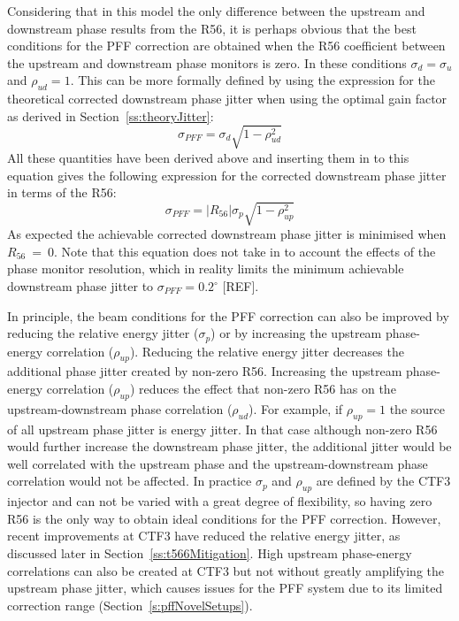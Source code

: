 Considering that in this model the only difference between the upstream and downstream phase results from the R56, it is perhaps obvious that the best conditions for the PFF correction are obtained when the R56 coefficient between the upstream and downstream phase monitors is zero. In these conditions \(\sigma_d = \sigma_u\) and \(\rho_{ud} = 1\). This can be more formally defined by using the expression for the theoretical corrected downstream phase jitter when using the optimal gain factor as derived in Section~\ref{ss:theoryJitter}:
\begin{equation}
\sigma_{PFF} = \sigma_d\sqrt{1-\rho_{ud}^2}
\end{equation}
All these quantities have been derived above and inserting them in to this equation gives the following expression for the corrected downstream phase jitter in terms of the R56:
\begin{equation}
\sigma_{PFF} = \left|R_{56}\right|\sigma_p\sqrt{1-\rho_{up}^2}
\label{e:r56PFFJit}
\end{equation}
As expected the achievable corrected downstream phase jitter is minimised when \(R_{56}~=~0\). Note that this equation does not take in to account the effects of the phase monitor resolution, which in reality limits the minimum achievable downstream phase jitter to \(\sigma_{PFF}=0.2^\circ\) [REF]. 

In principle, the beam conditions for the PFF correction can also be improved by reducing the relative energy jitter (\(\sigma_p\)) or by increasing the upstream phase-energy correlation (\(\rho_{up}\)). Reducing the relative energy jitter decreases the additional phase jitter created by non-zero R56. Increasing the upstream phase-energy correlation (\(\rho_{up}\)) reduces the effect that non-zero R56 has on the upstream-downstream phase correlation (\(\rho_{ud}\)). For example, if \(\rho_{up}=1\) the source of all upstream phase jitter is energy jitter. In that case although non-zero R56 would further increase the downstream phase jitter, the additional jitter would be well correlated with the upstream phase and the upstream-downstream phase correlation would not be affected. In practice \(\sigma_p\) and \(\rho_{up}\) are defined by the CTF3 injector and can not be varied with a great degree of flexibility, so having zero R56 is the only way to obtain ideal conditions for the PFF correction. However, recent improvements at CTF3 have reduced the relative energy jitter, as discussed later in Section~\ref{ss:t566Mitigation}. High upstream phase-energy correlations can also be created at CTF3 but not without greatly amplifying the upstream phase jitter, which causes issues for the PFF system due to its limited correction range (Section~\ref{s:pffNovelSetups}).

